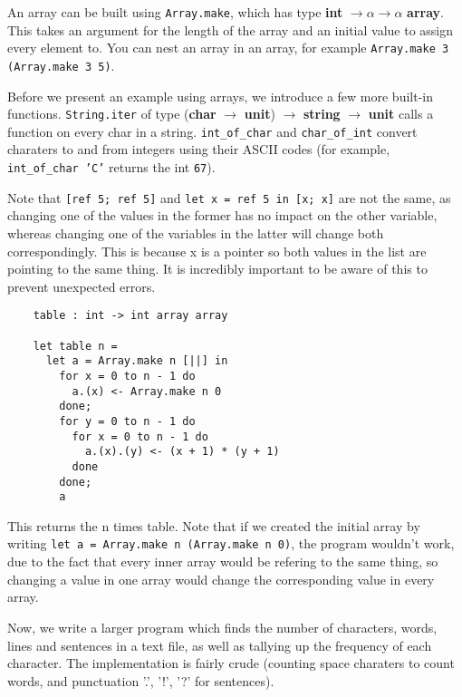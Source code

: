 \documentclass[12pt]{article}
\begin{document}
An array
can be built using \texttt{Array.make}, which has type \textbf{int} $\rightarrow \alpha \rightarrow \alpha$ \textbf{array}. This takes an argument for the length of the
array and an initial value to assign every element to. You can nest an array in an array, for example \texttt{Array.make 3 (Array.make 3 5)}.

Before we present an example using arrays, we introduce a few more built-in functions. \texttt{String.iter} of type (\textbf{char} $\rightarrow$ \textbf{unit})
$\rightarrow$ \textbf{string} $\rightarrow$ \textbf{unit} calls a function on every char in a string. \texttt{int\_of\_char} and \texttt{char\_of\_int}
convert charaters to and from integers using their ASCII codes (for example, \texttt{int\_of\_char 'C'} returns the int \texttt{67}).

Note that \texttt{[ref 5; ref 5]} and \texttt{let x = ref 5 in [x; x]} are not the same, as changing one of the
values in the former has no impact on the other variable, whereas changing one of the variables in the latter will
change both correspondingly. This is because x is a pointer so both values in the list are pointing to the same thing. It
is incredibly important to be aware of this to prevent unexpected errors.

\begin{lstlisting}
    table : int -> int array array

    let table n =
      let a = Array.make n [||] in
        for x = 0 to n - 1 do
          a.(x) <- Array.make n 0
        done;
        for y = 0 to n - 1 do
          for x = 0 to n - 1 do
            a.(x).(y) <- (x + 1) * (y + 1)
          done
        done;
        a
\end{lstlisting}
This returns the n times table. Note that if we created the initial array by writing \texttt{let
a = Array.make n (Array.make n 0)}, the program wouldn't work, due to the fact that every inner array
would be refering to the same thing, so changing a value in one array would change the corresponding
value in every array.

Now, we write a larger program which finds the number of characters, words, lines and sentences in a text
file, as well as tallying up the frequency of each character. The implementation is fairly crude (counting
space charaters to count words, and punctuation '.', '!', '?' for sentences).
\end{document}
